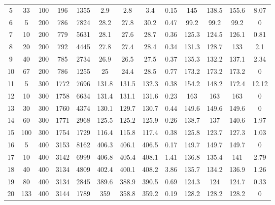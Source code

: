 \documentclass[11pt]{article}
\begin{document}
\begin{table}[]
{\begin{tabular}{ccccc|cccc|cccc}
			\rowcolor[HTML]{EFEFEF} 
			5  & 33  & 100 & 196  & 1355 & 2.9   & 2.8   & 3.4   & 0.15 & 145   & 138.5 & 155.6 & 8.07  \\
			6  & 5   & 200 & 786  & 7824 & 28.2  & 27.8  & 30.2  & 0.47 & 99.2  & 99.2  & 99.2  & 0     \\
			7  & 10  & 200 & 779  & 5631 & 28.1  & 27.6  & 28.7  & 0.36 & 125.3 & 124.5 & 126.1 & 0.81  \\
			8  & 20  & 200 & 792  & 4445 & 27.8  & 27.4  & 28.4  & 0.34 & 131.3 & 128.7 & 133   & 2.1   \\
			9  & 40  & 200 & 785  & 2734 & 26.9  & 26.5  & 27.5  & 0.37 & 135.3 & 132.2 & 137.1 & 2.34  \\
			10 & 67  & 200 & 786  & 1255 & 25    & 24.4  & 28.5  & 0.77 & 173.2 & 173.2 & 173.2 & 0     \\
			\rowcolor[HTML]{EFEFEF} 
			11 & 5   & 300 & 1772 & 7696 & 131.8 & 131.5 & 132.3 & 0.38 & 154.2 & 148.2 & 172.4 & 12.12 \\
			\rowcolor[HTML]{EFEFEF} 
			12 & 10  & 300 & 1758 & 6634 & 131.4 & 131.1 & 131.6 & 0.23 & 163   & 163   & 163   & 0     \\
			\rowcolor[HTML]{EFEFEF} 
			13 & 30  & 300 & 1760 & 4374 & 130.1 & 129.7 & 130.7 & 0.44 & 149.6 & 149.6 & 149.6 & 0     \\
			\rowcolor[HTML]{EFEFEF} 
			14 & 60  & 300 & 1771 & 2968 & 125.5 & 125.2 & 125.9 & 0.26 & 138.7 & 137   & 140.6 & 1.97  \\
			\rowcolor[HTML]{EFEFEF} 
			15 & 100 & 300 & 1754 & 1729 & 116.4 & 115.8 & 117.4 & 0.38 & 125.8 & 123.7 & 127.3 & 1.03  \\
			16 & 5   & 400 & 3153 & 8162 & 406.3 & 406.1 & 406.5 & 0.17 & 149.7 & 149.7 & 149.7 & 0     \\
			17 & 10  & 400 & 3142 & 6999 & 406.8 & 405.4 & 408.1 & 1.41 & 136.8 & 135.4 & 141   & 2.79  \\
			18 & 40  & 400 & 3134 & 4809 & 402.4 & 400.1 & 408.2 & 3.86 & 135.7 & 134.2 & 136.9 & 1.26  \\
			19 & 80  & 400 & 3134 & 2845 & 389.6 & 388.9 & 390.5 & 0.69 & 124.3 & 124   & 124.7 & 0.33  \\
			20 & 133 & 400 & 3144 & 1789 & 359   & 358.8 & 359.2 & 0.19 & 128.2 & 128.2 & 128.2 & 0    
		\end{tabular}%
	}
\end{table}			
			
			
	
	
\end{document}
